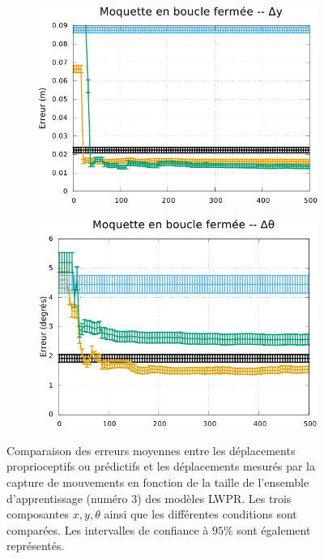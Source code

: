 \begin{figure}[htb]
\begin{subfigure}{0.29\paperwidth}
        \includegraphics[type=pdf,ext=.pdf,read=.pdf,width=1.0\linewidth]{../plot/OdometryLWPR/carpet_close_convergence_y}
    \end{subfigure}
    \begin{subfigure}{0.29\paperwidth}
        \centering
        \includegraphics[type=pdf,ext=.pdf,read=.pdf,width=1.0\linewidth]{../plot/OdometryLWPR/carpet_close_convergence_yaw}
    \end{subfigure}
    \caption{\label{fig:odometry_lwpr_convergence} 
        Comparaison des erreurs moyennes entre les déplacements proprioceptifs ou prédictifs et les déplacements mesurés par 
        la capture de mouvements en fonction de la taille de l'ensemble d'apprentissage (numéro $3$) des modèles LWPR.
        Les trois composantes $x,y,\theta$ ainsi que les différentes conditions sont comparées.
        Les intervalles de confiance à $95$\% sont également représentés.
    }
\end{figure}

